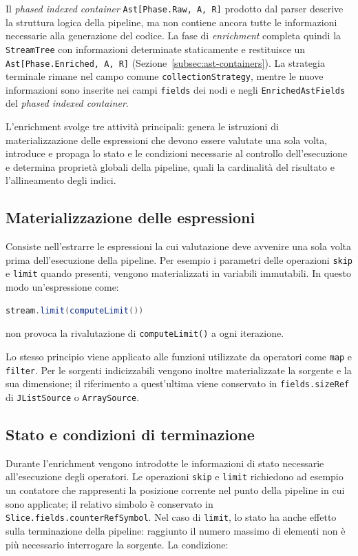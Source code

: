 \documentclass[a4paper,11pt]{report}
\theoremstyle{definition}
\begin{document}
Il \emph{phased indexed container} \texttt{Ast[Phase.Raw, A, R]} prodotto dal parser descrive la struttura logica della pipeline, ma non contiene ancora tutte le informazioni necessarie alla generazione del codice. La fase di \emph{enrichment} completa quindi la \texttt{StreamTree} con informazioni determinate staticamente e restituisce un \texttt{Ast[Phase.Enriched, A, R]} (Sezione~\ref{subsec:ast-containers}). La strategia terminale rimane nel campo comune \texttt{collectionStrategy}, mentre le nuove informazioni sono inserite nei campi \texttt{fields} dei nodi e negli \texttt{EnrichedAstFields} del \emph{phased indexed container}.

L'enrichment svolge tre attività principali: genera le istruzioni di materializzazione delle espressioni che devono essere valutate una sola volta, introduce e propaga lo stato e le condizioni necessarie al controllo dell'esecuzione e determina proprietà globali della pipeline, quali la cardinalità del risultato e l'allineamento degli indici.

\subsection{Materializzazione delle espressioni}

Consiste nell'estrarre le espressioni la cui valutazione deve avvenire una sola volta prima dell'esecuzione della pipeline. Per esempio i parametri delle operazioni \texttt{skip} e \texttt{limit} quando presenti, vengono materializzati in variabili immutabili. In questo modo un'espressione come:

\begin{lstlisting}[language=Scala]
stream.limit(computeLimit())
\end{lstlisting}

non provoca la rivalutazione di \texttt{computeLimit()} a ogni iterazione.

Lo stesso principio viene applicato alle funzioni utilizzate da operatori come \texttt{map} e \texttt{filter}. Per le sorgenti indicizzabili vengono inoltre materializzate la sorgente e la sua dimensione; il riferimento a quest'ultima viene conservato in \texttt{fields.sizeRef} di \texttt{JListSource} o \texttt{ArraySource}.
\subsection{Stato e condizioni di terminazione}

Durante l'enrichment vengono introdotte le informazioni di stato necessarie all'esecuzione degli operatori. Le operazioni \texttt{skip} e \texttt{limit} richiedono ad esempio un contatore che rappresenti la posizione corrente nel punto della pipeline in cui sono applicate; il relativo simbolo è conservato in \texttt{Slice.fields.counterRefSymbol}. Nel caso di \texttt{limit}, lo stato ha anche effetto sulla terminazione della pipeline: raggiunto il numero massimo di elementi non è più necessario interrogare la sorgente. La condizione:
\end{document}
